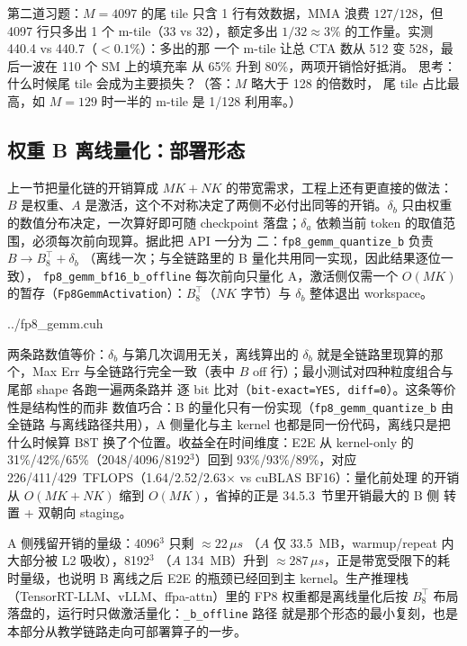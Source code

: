 第二道习题：$M{=}4097$ 的尾 tile 只含 1 行有效数据，MMA 浪费
$127/128$，但 4097 行只多出 1 个 m-tile（33 vs 32），额定多出
$1/32\approx 3\%$ 的工作量。实测 440.4 vs 440.7（$<0.1\%$）：多出的那
一个 m-tile 让总 CTA 数从 512 变 528，最后一波在 110 个 SM 上的填充率
从 65\% 升到 80\%，两项开销恰好抵消。
思考：什么时候尾 tile 会成为主要损失？（答：$M$ 略大于 128 的倍数时，
尾 tile 占比最高，如 $M{=}129$ 时一半的 m-tile 是 1/128 利用率。）

\subsection{权重 B 离线量化：部署形态}\label{sec:35-b-offline}

上一节把量化链的开销算成 $MK+NK$ 的带宽需求，工程上还有更直接的做法：
$B$ 是权重、$A$ 是激活，这个不对称决定了两侧不必付出同等的开销。$\delta_b$
只由权重的数值分布决定，一次算好即可随 checkpoint 落盘；$\delta_a$
依赖当前 token 的取值范围，必须每次前向现算。据此把 API 一分为
二：\texttt{fp8\_gemm\_quantize\_b} 负责 $B\to B_8^{\top}+\delta_b$
（离线一次；与全链路里的 B 量化共用同一实现，因此结果逐位一致），
\texttt{fp8\_gemm\_bf16\_b\_offline} 每次前向只量化 A，激活侧仅需一个
$O(MK)$ 的暂存（\texttt{Fp8GemmActivation}）：$B_8^{\top}$（$NK$
字节）与 $\delta_b$ 整体退出 workspace。

\begin{lstinputlisting}[linerange={922-955},firstnumber=auto,
  title={fp8\_gemm.cuh L922-955（fp8\_gemm\_bf16\_b\_offline：只量化 A，B 从离线产物取）}]{../fp8_gemm.cuh}
\end{lstinputlisting}

两条路数值等价：$\delta_b$ 与第几次调用无关，离线算出的
$\delta_b$ 就是全链路里现算的那个，Max Err 与全链路行完全一致（表中
$B$ off 行）；最小测试对四种粒度组合与尾部 shape 各跑一遍两条路并
逐 bit 比对（\texttt{bit-exact=YES, diff=0}）。这条等价性是结构性的而非
数值巧合：B 的量化只有一份实现（\texttt{fp8\_gemm\_quantize\_b} 由全链路
与离线路径共用），A 侧量化与主 kernel 也都是同一份代码，离线只是把
什么时候算 B8T 换了个位置。收益全在时间维度：E2E 从 kernel-only 的
31\%/42\%/65\%（2048/4096/8192$^3$）回到 93\%/93\%/89\%，对应
226/411/429~TFLOPS（1.64/2.52/2.63$\times$ vs cuBLAS BF16）：量化前处理
的开销从 $O(MK{+}NK)$ 缩到 $O(MK)$，省掉的正是 34.5.3~节里开销最大的 B 侧
转置 + 双朝向 staging。

A 侧残留开销的量级：4096$^3$ 只剩 $\approx 22\,\mu s$
（$A$ 仅 33.5~MB，warmup/repeat 内大部分被 L2 吸收），8192$^3$
（$A$ 134~MB）升到 $\approx 287\,\mu s$，正是带宽受限下的耗时量级，也说明
B 离线之后 E2E 的瓶颈已经回到主 kernel。生产推理栈
（TensorRT-LLM、vLLM、ffpa-attn）里的 FP8 权重都是离线量化后按
$B_8^{\top}$ 布局落盘的，运行时只做激活量化：\texttt{\_b\_offline} 路径
就是那个形态的最小复刻，也是本部分从教学链路走向可部署算子的一步。


